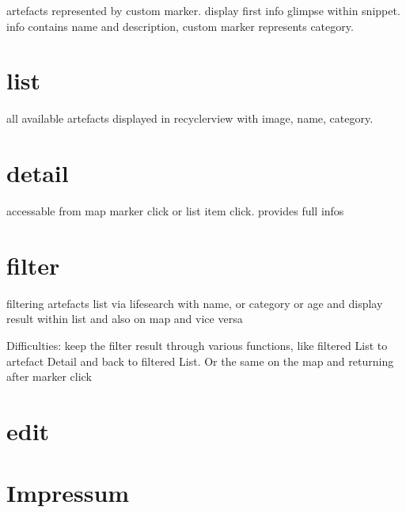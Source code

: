 artefacts represented by custom marker. display first info glimpse within snippet. info contains name and description, custom marker represents category.

\section{list}
all available artefacts displayed in recyclerview with image, name, category.

\section{detail}
accessable from map marker click or list item click. provides full infos

\section{filter}
filtering artefacts list via lifesearch with name, or category or age and display result within list and also on map and vice versa

Difficulties: keep the filter result through various functions, like filtered List to artefact Detail and back to filtered List.
Or the same on the map and returning after marker click

\section{edit}

\section{Impressum}

